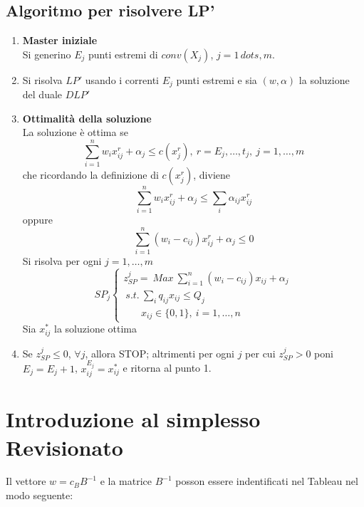 \subsection{Algoritmo per risolvere LP'}
\begin{enumerate}
	\item \textbf{Master iniziale}\\
	Si generino $E_{j}$ punti estremi di $conv(X_{j})$, $j=1\,dots,m$.
	\item Si risolva $LP'$ usando i correnti $E_{j}$ punti estremi e sia $(w,\alpha)$ la soluzione del duale $DLP'$
	\item \textbf{Ottimalità della soluzione}\\
	La soluzione è ottima se
	\begin{equation*}
		\sum_{i=1}^{n}w_{i}x_{ij}^{r}+\alpha_{j}\le c(x_{j}^{r}),\ r=E_{j},\dots,t_{j},\ j=1,\dots,m
	\end{equation*}
	che ricordando la definizione di $c(x_{j}^{r})$, diviene
	\begin{equation*}
		\sum_{i=1}^{n}w_{i}x_{ij}^{r}+\alpha_{j}\le \sum_{i}\alpha_{ij}x_{ij}^{r}
	\end{equation*}
	oppure
	\begin{equation*}
		\sum_{i=1}^{n}(w_{i}-c_{ij})x_{ij}^{r}+\alpha_{j}\le 0
	\end{equation*}
	Si risolva per ogni $j=1,\dots,m$
	\begin{equation*}
		SP_{j}
		\begin{cases}
			z_{SP}^{j}=\ Max\ \sum_{i=1}^{n}(w_{i}-c_{ij})x_{ij}+\alpha_{j} \\
			\ s.t.\ \sum_{i}q_{ij}x_{ij}\le Q_{j} \\
			\ \ \ \ \ \ \ \ x_{ij}\in\{0,1\},\ i=1,\dots,n
		\end{cases}
	\end{equation*}
	Sia $x_{ij}^{*}$ la soluzione ottima
	\item Se $z_{SP}^{j}\le 0$, $\forall j$, allora STOP; altrimenti per ogni $j$ per cui $z_{SP}^{j}>0$ poni $E_{j}=E_{j}+1$, $x_{ij}^{E_{j}}=x_{ij}^{*}$ e ritorna al punto 1.
\end{enumerate}

\section{Introduzione al simplesso Revisionato}
Il vettore $w=c_{B}B^{-1}$ e la matrice $B^{-1}$ posson essere indentificati nel Tableau nel modo seguente:

